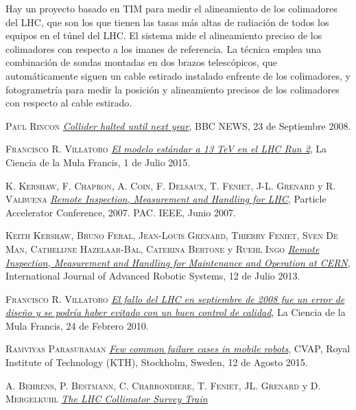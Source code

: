 \documentclass[a4paper, fontsize=11pt]{scrartcl} %
\numberwithin{equation}{section} %
\numberwithin{figure}{section} %
\numberwithin{table}{section} %
\begin{document}
	Hay un proyecto\cite{COLLIMATOR} basado en TIM para medir el alineamiento de los colimadores del LHC, que son los que tienen las tasas más altas de radiación de todos los equipos en el túnel del LHC. El sistema mide el alineamiento preciso de los colimadores con respecto a los imanes de referencia. La técnica emplea una combinación de sondas montadas en dos brazos telescópicos, que automáticamente siguen un cable estirado instalado enfrente de los colimadores, y fotogrametría para medir la posición y alineamiento precisos de los colimadores con respecto al cable estirado.\\
	
	 
	
	\begin{thebibliography}{X}
		
		 \textsc{Paul Rincon} \textit{\href{http://news.bbc.co.uk/2/hi/science/nature/7632408.stm}{Collider halted until next year}}, BBC NEWS, 23 de Septiembre 2008.
		
		 \textsc{Francisco R. Villatoro} \textit{\href{http://francis.naukas.com/2015/07/01/el-modelo-estandar-a-13-tev-en-el-lhc-run-2/}{El modelo estándar a 13 TeV en el LHC Run 2}}, La Ciencia de la Mula Francis, 1 de Julio 2015.
		
		 \textsc{K. Kershaw, F. Chapron, A. Coin, F. Delsaux, T. Feniet, J-L. Grenard} y \textsc{R. Valbuena} \textit{\href{http://ieeexplore.ieee.org/xpl/login.jsp?tp=&arnumber=4440202}{Remote Inspection, Measurement and Handling for LHC}}, Particle Accelerator Conference, 2007. PAC. IEEE, Junio 2007.
		
		 \textsc{Keith Kershaw, Bruno Feral, Jean-Louis Grenard, Thierry Feniet, Sven De Man, Cathelijne Hazelaar-Bal, Caterina Bertone} y \textsc{Ruehl Ingo} \textit{\href{http://cdn.intechopen.com/pdfs-wm/45831.pdf}{Remote Inspection, Measurement and Handling for Maintenance and Operation at CERN}}, International Journal of Advanced Robotic Systems, 12 de Julio 2013.
		
		 \textsc{Francisco R. Villatoro} \textit{\href{http://francis.naukas.com/2010/02/24/el-fallo-del-lhc-en-septiembre-de-2008-fue-un-error-de-diseno-y-se-podria-haber-evitado-con-un-buen-control-de-calidad/}{El fallo del LHC en septiembre de 2008 fue un error de diseño y se podría haber evitado con un buen control de calidad}}, La Ciencia de la Mula Francis, 24 de Febrero 2010.
		
		 \textsc{Ramviyas Parasuraman} \textit{\href{http://arxiv.org/abs/1508.03000}{Few common failure cases in mobile robots}}, CVAP, Royal Institute of Technology (KTH), Stockholm, Sweden, 12 de Agosto 2015.
		
		 \textsc{A. Behrens, P. Bestmann, C. Charrondiere, T. Feniet, JL. Grenard} y \textsc{D. Mergelkuhl} \textit{\href{http://iwaa2010.desy.de/e107506/e107507/e113279/e119275/IWAA2010_PB_train.pdf}{The LHC Collimator Survey Train}}
		
	\end{thebibliography}
	
 	
\end{document}
